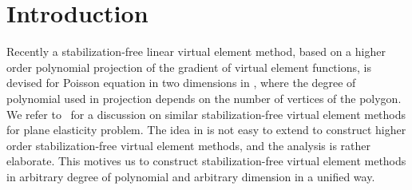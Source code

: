 \documentclass[10pt]{amsart}
\numberwithin{equation}{section}
\begin{document}


\maketitle


\section{Introduction}

Recently a stabilization-free linear virtual element method, based on a higher order polynomial projection of the gradient of virtual element functions, is devised for Poisson equation in two dimensions in \cite{BerroneBorioMarcon2021,BerroneBorioMarcon2022}, where the degree of polynomial used in projection depends on the number of vertices of the polygon. We refer to~\cite{DAltriMirandaPatrunoSacco2021} for a discussion on similar stabilization-free virtual element methods for plane elasticity problem.
The idea in \cite{BerroneBorioMarcon2021,BerroneBorioMarcon2022} is not easy to extend to construct higher order stabilization-free virtual element methods, and
the analysis is rather elaborate. 
This motives us to construct stabilization-free virtual element methods in arbitrary degree of polynomial and arbitrary dimension in a unified way.
\end{document}
